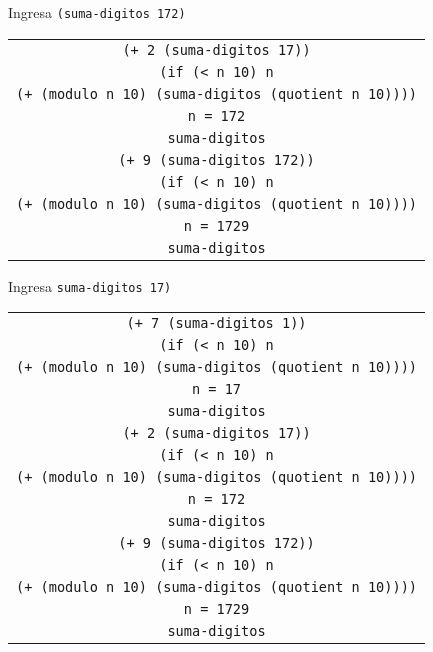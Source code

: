 \documentclass[letterpaper,11pt]{article}
\begin{document}
\begin{enumerate}
\begin{enumerate}
        Ingresa \texttt{(suma-digitos 172)}
        \begin{center}
            \begin{tabular}[h]{|c|}
                \hline
                \texttt{(+ 2 (suma-digitos 17))} \\
                \texttt{(if (< n 10) n} \\
                \texttt{(+ (modulo n 10) (suma-digitos (quotient n 10))))} \\ 
                \texttt{n = 172} \\
                \texttt{suma-digitos} \\
                \hline
                \hline
                \texttt{(+ 9 (suma-digitos 172))} \\
                \texttt{(if (< n 10) n} \\
                \texttt{(+ (modulo n 10) (suma-digitos (quotient n 10))))} \\ 
                \texttt{n = 1729} \\
                \texttt{suma-digitos} \\
                \hline
            \end{tabular}
        \end{center}

        Ingresa \texttt{suma-digitos 17)}
        \begin{center}
            \begin{tabular}[h]{|c|}
                \hline
                \texttt{(+ 7 (suma-digitos 1))} \\
                \texttt{(if (< n 10) n} \\
                \texttt{(+ (modulo n 10) (suma-digitos (quotient n 10))))} \\ 
                \texttt{n = 17} \\
                \texttt{suma-digitos} \\
                \hline
                \hline
                \texttt{(+ 2 (suma-digitos 17))} \\
                \texttt{(if (< n 10) n} \\
                \texttt{(+ (modulo n 10) (suma-digitos (quotient n 10))))} \\ 
                \texttt{n = 172} \\
                \texttt{suma-digitos} \\
                \hline
                \hline
                \texttt{(+ 9 (suma-digitos 172))} \\
                \texttt{(if (< n 10) n} \\
                \texttt{(+ (modulo n 10) (suma-digitos (quotient n 10))))} \\ 
                \texttt{n = 1729} \\
                \texttt{suma-digitos} \\
                \hline
            \end{tabular}
        \end{center}


\end{enumerate}
\end{enumerate}
\end{document}
